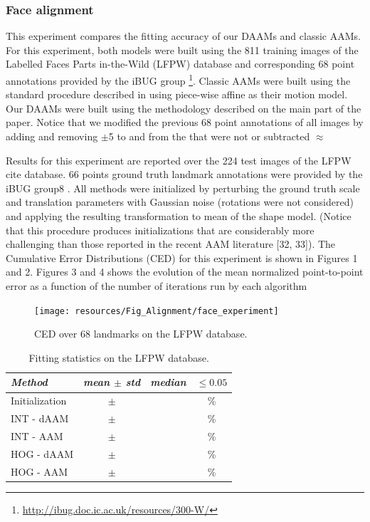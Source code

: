 \subsubsection{Face alignment}

This experiment compares the fitting accuracy of our DAAMs and classic AAMs. For this experiment, both models were built using the 811 training images of the Labelled Faces Parts in-the-Wild (LFPW) \cite{} database and corresponding 68 point annotations provided by the iBUG group \footnote{\label{ibug_300}\url{http://ibug.doc.ic.ac.uk/resources/300-W/}}. Classic AAMs were built using the standard procedure described in \cite{} using piece-wise affine as their motion model. Our DAAMs were built using the methodology described on the main part of the paper. Notice that we modified the previous 68 point annotations of all images by adding and removing $\pm$5 to and from the that were not or subtracted $\approx$ 

Results for this experiment are reported over the 224 test images of the LFPW cite{} database. 66
points ground truth landmark annotations were provided by
the iBUG group8
. All methods were initialized by perturbing
the ground truth scale and translation parameters with
Gaussian noise (rotations were not considered) and applying
the resulting transformation to mean of the shape model.
(Notice that this procedure produces initializations that are
considerably more challenging than those reported in the recent
AAM literature [32, 33]). The Cumulative Error Distributions
(CED) for this experiment is shown in Figures 1
and 2. Figures 3 and 4 shows the evolution of the mean
normalized point-to-point error as a function of the number
of iterations run by each algorithm

\begin{figure}[t!]
\centering
\texttt{[image: resources/Fig\_Alignment/face\_experiment]}
\caption{CED over 68 landmarks on the LFPW database.}
\label{fig:face_ced}
\end{figure}

\begin{table}[t]
\small
\centering
\begin{tabular}{|l|c|c|c|}
\hline
\emph{Method}   & \emph{mean $\pm$ std} & \emph{median} & $\leq 0.05$\\
\hline
Initialization  & $\pm$ & & \%\\
\hline
INT - dAAM      & $\pm$ & & \%\\
INT - AAM       & $\pm$ & & \%\\
HOG - dAAM      & $\pm$ & & \%\\
HOG - AAM       & $\pm$ & & \%\\
\hline
\end{tabular}
\caption{Fitting statistics on the LFPW database.}
\label{tab:face_statistics}
\end{table}


